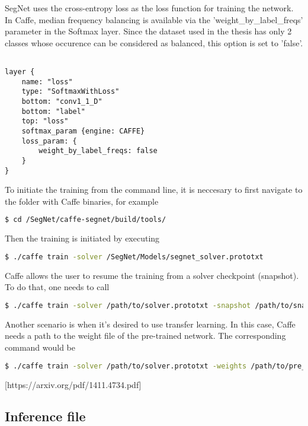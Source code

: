 SegNet uses the cross-entropy loss as the loss function for
training the network. In Caffe, median frequency balancing is available via the 'weight\_by\_label\_freqs' parameter in the Softmax layer. Since the dataset used in the thesis has only 2 classes whose occurence can be considered as balanced, this option is set to 'false'. 

\begin{lstlisting}

layer {
	name: "loss"
	type: "SoftmaxWithLoss"
	bottom: "conv1_1_D"
	bottom: "label"
	top: "loss"
	softmax_param {engine: CAFFE}
	loss_param: {
		weight_by_label_freqs: false	     
	}
}

\end{lstlisting}

To initiate the training from the command line, it is neccesary to first navigate to the folder with Caffe binaries, for example

\begin{lstlisting}[language=bash]
$ cd /SegNet/caffe-segnet/build/tools/
\end{lstlisting}

Then the training is initiated by executing

\begin{lstlisting}[language=bash]
$ ./caffe train -solver /SegNet/Models/segnet_solver.prototxt
\end{lstlisting}

Caffe allows the user to resume the training from a solver checkpoint (snapshot). To do that, one needs to call

\begin{lstlisting}[language=bash]
$ ./caffe train -solver /path/to/solver.prototxt -snapshot /path/to/snapshot_iter_XY.solverstate
\end{lstlisting}

Another scenario is when it's desired to use transfer learning. In this case, Caffe needs a path to the weight file of the pre-trained network. The corresponding command would be

\begin{lstlisting}[language=bash]
$ ./caffe train -solver /path/to/solver.prototxt -weights /path/to/pre_trained_weights.caffemodel
\end{lstlisting}


 [https://arxiv.org/pdf/1411.4734.pdf]

\subsection{Inference file}

